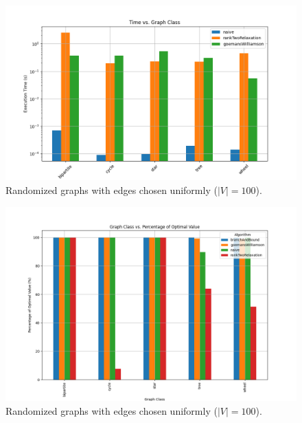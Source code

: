 \begin{figure}[H]
\centering
\includegraphics[width=\textwidth]{chapters/benchmark/Sections/images/cut/graph_types/time_vs_graph_class.png}
\caption{ Randomized graphs with edges chosen uniformly (\(|V| = 100\)).}
\end{figure}

\begin{figure}[H]
\centering
\includegraphics[width=\textwidth]{chapters/benchmark/Sections/images/cut/graph_types/graph_class_vs_percentage_optimal.png}
\caption{ Randomized graphs with edges chosen uniformly (\(|V| = 100\)).}
\end{figure}

